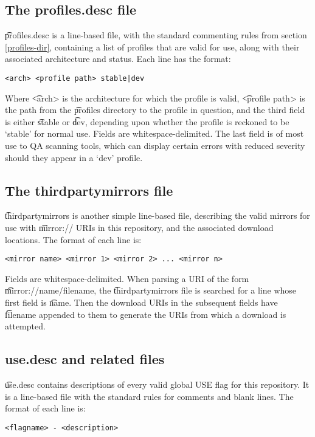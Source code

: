 \subsection{The profiles.desc file}
\label{profiles.desc}
\t{profiles.desc} is a line-based file, with the standard commenting rules from section
\ref{profiles-dir}, containing a list of profiles that are valid for use, along with their
associated architecture and status. Each line has the format:
\begin{verbatim}
<arch> <profile path> stable|dev
\end{verbatim}
Where \t{<arch>} is the architecture for which the profile is valid, \t{<profile path>} is the path
from the \t{profiles} directory to the profile in question, and the third field is either \t{stable}
or \t{dev}, depending upon whether the profile is reckoned to be `stable' for normal use. Fields are
whitespace-delimited. The last field is of most use to QA scanning tools, which can display certain
errors with reduced severity should they appear in a `dev' profile.

\subsection{The thirdpartymirrors file}
\label{thirdpartymirrors}
\t{thirdpartymirrors} is another simple line-based file, describing the valid mirrors for use with
\t{mirror://} URIs in this repository, and the associated download locations. The format of each
line is:
\begin{verbatim}
<mirror name> <mirror 1> <mirror 2> ... <mirror n>
\end{verbatim}
Fields are whitespace-delimited. When parsing a URI of the form \t{mirror://name/filename}, the
\t{thirdpartymirrors} file is searched for a line whose first field is \t{name}. Then the download
URIs in the subsequent fields have \t{filename} appended to them to generate the URIs from which a
download is attempted.

\subsection{use.desc and related files}
\label{use.desc}
\t{use.desc} contains descriptions of every valid global USE flag for this repository. It is a
line-based file with the standard rules for comments and blank lines. The format of each line is:
\begin{verbatim}
<flagname> - <description>
\end{verbatim}

